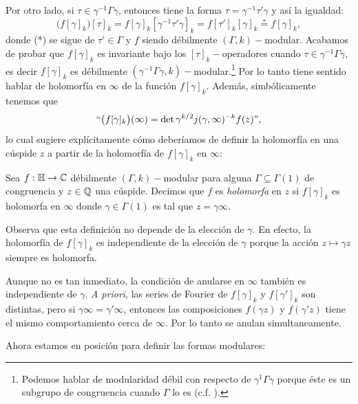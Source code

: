 Por otro lado, si $\tau\in\gamma^{-1}\Gamma\gamma$, entonces tiene la forma
$\tau=\gamma^{-1}\tau'\gamma$ y as\'i la igualdad:
\[
  \big(f[\gamma]_k\big)[\tau]_k=f[\gamma]_k[\gamma^{-1}\tau'\gamma]_k=f[\tau']_k[\gamma]_k
  \overset{*}{=}f[\gamma]_k,
\]
donde (*) se sigue de $\tau'\in\Gamma$ y $f$ siendo d\'ebilmente $(\Gamma,k)-$modular. Acabamos
de probar que $f[\gamma]_k$ es invariante bajo los $[\tau]_k-$operadores cuando
$\tau\in\gamma^{-1}\Gamma\gamma$, es decir $f[\gamma]_k$ es d\'ebilmente
$(\gamma^{-1}\Gamma\gamma,k)-$modular.\footnote{Podemos hablar de modularidad d\'ebil con respecto
  de $\gamma^{1}\Gamma\gamma$ porque \'este es un subgrupo de congruencia cuando $\Gamma$ lo es
  (c.f. \cite[\S1.4, lema 1.4.1]{BumpAFAR}).}
Por lo tanto tiene sentido hablar de holomorf\'ia en $\infty$ de la funci\'on $f[\gamma]_k$. Adem\'as,
simb\'olicamente tenemos que
\[
  ``\big(f[\gamma]_k\big)(\infty)=\det\gamma^{k/2}j(\gamma,\infty)^{-k}f(z)\text{''},
\]
lo cual sugiere expl\'icitamente c\'omo deber\'iamos de definir la holomorf\'ia en una c\'uspide
$z$ a partir de la holomorf\'ia de $f[\gamma]_k$ en $\infty$:

\begin{defin}
  Sea $f:\mathbb{H}\rightarrow\mathbb{C}$ d\'ebilmente $(\Gamma,k)-$modular para alguna $\Gamma\subseteq\Gamma(1)$ de
  congruencia y $z\in\mathbb{Q}$ una c\'uspide. Decimos que $f$ es \emph{holomorfa} en $z$ si $f[\gamma]_k$
  es holomorfa en $\infty$ donde $\gamma\in\Gamma(1)$ es tal que $z=\gamma\infty$.
\end{defin}

Observa que esta definici\'on no depende de la elecci\'on de $\gamma$. En efecto, la holomorf\'ia
de $f[\gamma]_k$ es independiente de la elecci\'on de $\gamma$ porque la acci\'on $z\mapsto\gamma z$
siempre es holomorfa.

Aunque no es tan inmediato, la condici\'on de anularse en $\infty$ tambi\'en es independiente de
$\gamma$. \emph{A priori}, las series de Fourier de $f[\gamma]_k$ y $f[\gamma']_k$ son distintas,
pero si $\gamma\infty=\gamma'\infty$, entonces las composiciones $f(\gamma z)$ y $f(\gamma'z)$ tiene
el mismo comportamiento cerca de $\infty$. Por lo tanto se anulan simultaneamente.

Ahora estamos en posici\'on para definir las formas modulares:

